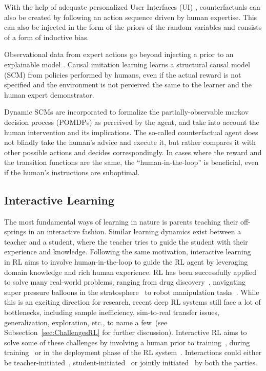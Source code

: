 \documentclass[twoside,11pt]{article}
\begin{document}
With the help of adequate personalized User Interfaces (UI) \citep{Sun:2021:TopologyPerturbationGNNs}, counterfactuals can also be created by following an action sequence driven by human expertise. This can also be injected in the form of the priors of the random variables and consists of a form of inductive bias.

Observational data from expert actions go beyond injecting a prior to an explainable model \citep{Zhang:2020:CausalImitationLearning}. Causal imitation learning learns a structural causal model (SCM) \citep{Pearl:2000:ModelsReasoningInference} from policies performed by humans, even if the actual reward is not specified and the environment is not perceived the same to the learner and the human expert demonstrator. 

Dynamic SCMs are incorporated to formalize the partially-observable markov decision process (POMDPs) \citep{SuttonBarto:2018:RLIntroduction} as perceived by the agent, and take into account the human intervention and its implications. The so-called counterfactual agent does not blindly take the human's advice and execute it, but rather compares it with other possible actions and decides correspondingly. In cases where the reward and the transition functions are the same, the ``human-in-the-loop'' is beneficial, even if the human's instructions are suboptimal.

\subsection{Interactive Learning}
\label{sec:InteractiveLearning}
    
The most fundamental ways of learning in nature is parents teaching their off-springs in an interactive fashion. Similar learning dynamics exist between a teacher and a student, where the teacher tries to guide the student with their experience and knowledge. Following the same motivation, interactive learning~\citep{Arzate:2020:SurveyInteractiveRL} in RL aims to involve human-in-the-loop to guide the RL agent by leveraging domain knowledge and rich human experience. RL has been successfully applied to solve many real-world problems, ranging from drug discovery~\citep{popova2018deep}, navigating super pressure balloons in the stratosphere~\citep{bellemare2020autonomous} to robot manipulation tasks~\citep{nguyen2019review}. While this is an exciting direction for research, recent deep RL systems still face a lot of bottlenecks, including sample inefficiency, sim-to-real transfer issues, generalization, exploration, etc., to name a few~(see Subsection~\ref{sec:ChallengesRL} for further discussion)\citep{ibarz2021train}. Interactive RL aims to solve some of these challenges by involving a human prior to training~\citep{Guo:2022:RLSurveyHumanPriorKnowledge}, during training~\citep{Knox:2008:TAMER} or in the deployment phase of the RL system~\citep{guo2021edge}. Interactions could either be teacher-initiated~\citep{torrey2013teaching}, student-initiated~\citep{da2020uncertainty,MandelEtAl:2017ActionsInHITL} or jointly initiated~\citep{amir2016interactive} by both the parties.
\end{document}

